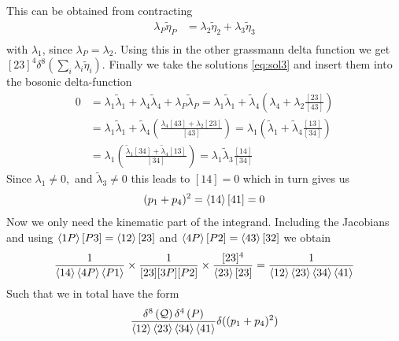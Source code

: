 \documentclass[letter,11pt]{article}
\begin{document}
This can be obtained from contracting
\begin{equation}
	\begin{aligned}
\lambda_P\tilde\eta_{P}	&=\lambda_2\tilde \eta_2+ \lambda_3 \tilde \eta_3\\	
	\end{aligned}
\end{equation}
 with $\lambda_1$, since $\lambda_P=\lambda_2$. Using this in the other grassmann  delta function we get $[23]^4\delta^8(\sum_i\lambda_i\tilde\eta_i)$. Finally we take the solutions \eqref{eq:sol3} and insert them into the bosonic delta-function
 \begin{equation}
 	\begin{aligned}
 		0&=\lambda_1\tilde\lambda_1+\lambda_4\tilde\lambda_4+\lambda_P\tilde\lambda_P
 		=\lambda_1\tilde\lambda_1+\tilde\lambda_4 \left(\lambda_4+\lambda_2  \frac{[23]}{[43]}\right)
 		\\
 		&=\lambda_1\tilde\lambda_1+\tilde\lambda_4 \left(  \frac{\lambda_4[43]+\lambda_2[23]}{[43]}\right)=\lambda_1 \left(\tilde\lambda_1 +\tilde\lambda_4 \frac{[13]}{[34]}\right)
 			\\
 		&=\lambda_1 \left( \frac{\tilde\lambda_1[34]+\tilde\lambda_4[13]}{[34]}\right)=\lambda_1 \tilde\lambda_3 \frac{[14]}{[34]}
 	\end{aligned}
 \end{equation}
Since $\lambda_1\neq0,$ and $\tilde\lambda_3\neq0$ this leads to $[14]=0$ which in turn gives us
\begin{equation}
	\begin{aligned}
		(p_1+p_4)^2=\expval{14}[41]=0
	\end{aligned}
\end{equation}
Now we only need the kinematic part of the integrand. Including the Jacobians and using $\expval{1P}[P3]=\expval{12}[23]$ and $\expval{4P}[P2]=\expval{43}[32]$ we obtain
\begin{equation}
	\begin{aligned}
		\frac{1}{\expval{14}\expval{4P}\expval{P1}}\times\frac{1}{[23][3P][P2]}\times \frac{[23]^4}{\expval{23}[23]}&=\frac{1}{\expval{12}\expval{23}\expval{34}\expval{41}}\\
	\end{aligned}
\end{equation}
Such that we in total have the form
\begin{equation}
	\begin{aligned}
		\frac{\delta^{8}\left(\mathcal{Q}\right)\delta^{4}\left(P\right)}{\expval{12}\expval{23}\expval{34}\expval{41}}\delta((p_1+p_4)^2)
	\end{aligned}
\end{equation}
\end{document}
